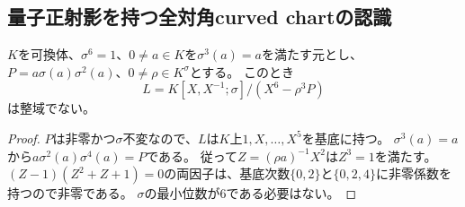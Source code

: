 \subsection{量子正射影を持つ全対角curved chartの認識}
\label{subsec:h3-order2-22-curved-quantum-diagonal}
\begin{lemma}[三次normが与える六項Laurent商の零因子]
\label{lem:h3-cubic-norm-six-term-obstruction}
$K$を可換体、$\sigma^6=1$、$0\ne a\in K$を$\sigma^3(a)=a$を満たす元とし、
$P=a\sigma(a)\sigma^2(a)$、$0\ne\rho\in K^\sigma$とする。
このとき
\[
 L=K[X,X^{-1};\sigma]/(X^6-\rho^3P)
\]
は整域でない。
\end{lemma}
\begin{proof}
$P$は非零かつ$\sigma$不変なので、$L$は$K$上$1,X,\ldots,X^5$を基底に持つ。
$\sigma^3(a)=a$から$a\sigma^2(a)\sigma^4(a)=P$である。
従って$Z=(\rho a)^{-1}X^2$は$Z^3=1$を満たす。
$(Z-1)(Z^2+Z+1)=0$の両因子は、基底次数$\{0,2\}$と$\{0,2,4\}$に非零係数を持つので非零である。
$\sigma$の最小位数が6である必要はない。
\end{proof}

